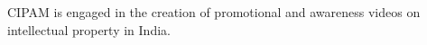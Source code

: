 \documentclass[preview]{standalone}
\begin{document}
\begin{flushleft}
\fontsize{15}{0}\selectfont CIPAM is engaged in the creation of promotional and awareness videos on intellectual property in India.
\end{flushleft}
\end{document}
